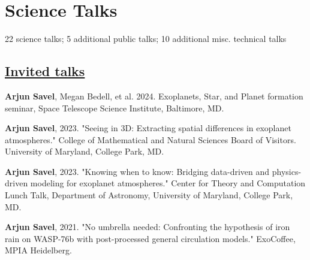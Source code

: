 \documentclass[letterpaper,11pt]{article}
\newcommand{\shorterSection}[1]{\vspace{-10pt}\section{#1}}
\newcommand{\shortershorterSection}[1]{\vspace{-10pt}\subsection{#1}}
\begin{document}
\begin{list}{}{\cvlist}



     
  
  \end{list}

\shorterSection{Science Talks}
\vspace{-2pt}
22 science talks; 5 additional public talks; 10 additional misc. technical talks
\vspace{1pt}
\shortershorterSection{\underline{Invited talks}}
\small
  \begin{list}{}{\cvlist}

    \item[{\color{numcolor}\scriptsize4}] \textbf{Arjun Savel}, Megan Bedell, et al. 2024. Exoplanets, Star, and Planet formation seminar, Space Telescope Science Institute, Baltimore, MD.


  \item[{\color{numcolor}\scriptsize3}] \textbf{Arjun Savel}, 2023. "Seeing in 3D: Extracting spatial differences in exoplanet atmospheres." College of Mathematical and Natural Sciences Board of Visitors. University of Maryland, College Park, MD.

  

  \item[{\color{numcolor}\scriptsize2}] \textbf{Arjun Savel}, 2023. "Knowing when to know: Bridging data-driven and physics-driven modeling for exoplanet atmospheres." Center for Theory and Computation Lunch Talk, Department of Astronomy, University of Maryland, College Park, MD.

   \item[{\color{numcolor}\scriptsize1}] \textbf{Arjun Savel}, 2021. "No umbrella needed: Confronting the hypothesis of iron rain on WASP-76b with post-processed general circulation models." ExoCoffee, MPIA Heidelberg.


  \end{list}
\end{document}
